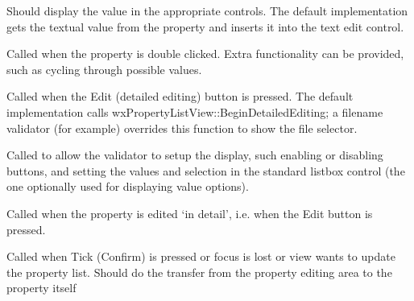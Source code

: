 
Should display the value in the appropriate controls. The default implementation gets the
textual value from the property and inserts it into the text edit control.
 


Called when the property is double clicked. Extra functionality can be provided,
such as cycling through possible values.


 
Called when the Edit (detailed editing) button is pressed. The default implementation
calls wxPropertyListView::BeginDetailedEditing; a filename validator (for example) overrides
this function to show the file selector.



Called to allow the validator to setup the display, such enabling or disabling buttons, and
setting the values and selection in the standard listbox control (the one optionally used for displaying
value options).


 
Called when the property is edited `in detail', i.e. when the Edit button is pressed.



Called when Tick (Confirm) is pressed or focus is lost or view wants to update
the property list. Should do the transfer from the property editing area to the property itself

